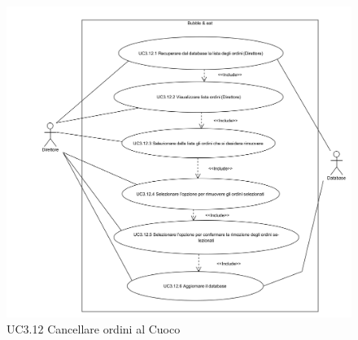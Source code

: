 \begin{figure}[H]
	\centering
	\includegraphics[width=15cm]{../../documenti/AnalisiDeiRequisiti/Diagrammi_img/uc3_12.png}
	\caption{UC3.12 Cancellare ordini al Cuoco}
\end{figure}

